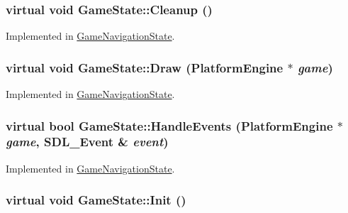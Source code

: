 \hypertarget{class_game_state_041e7a5430d71da84745af11abdacd93}{
\subsubsection[{Cleanup}]{\setlength{\rightskip}{0pt plus 5cm}virtual void GameState::Cleanup ()}}
\label{dd/d87/class_game_state_041e7a5430d71da84745af11abdacd93}




Implemented in \hyperlink{class_game_navigation_state_f93a7dbb7eac4b14a6d59cbca32b9abd}{GameNavigationState}.\hypertarget{class_game_state_7333dda0f49b3fa1c01cd3295f853024}{
\subsubsection[{Draw}]{\setlength{\rightskip}{0pt plus 5cm}virtual void GameState::Draw ({\bf PlatformEngine} $\ast$ {\em game})}}
\label{dd/d87/class_game_state_7333dda0f49b3fa1c01cd3295f853024}




Implemented in \hyperlink{class_game_navigation_state_a37dce070a906454c512192c067fda09}{GameNavigationState}.\hypertarget{class_game_state_de7bd9bda91253614322ca0ea77b7a14}{
\subsubsection[{HandleEvents}]{\setlength{\rightskip}{0pt plus 5cm}virtual bool GameState::HandleEvents ({\bf PlatformEngine} $\ast$ {\em game}, \/  SDL\_\-Event \& {\em event})}}
\label{dd/d87/class_game_state_de7bd9bda91253614322ca0ea77b7a14}




Implemented in \hyperlink{class_game_navigation_state_6e7c13d35a33478673c62ae55394cfdc}{GameNavigationState}.\hypertarget{class_game_state_eec488593bae214c0f738bd64dafba32}{
\subsubsection[{Init}]{\setlength{\rightskip}{0pt plus 5cm}virtual void GameState::Init ()}}
\label{dd/d87/class_game_state_eec488593bae214c0f738bd64dafba32}




